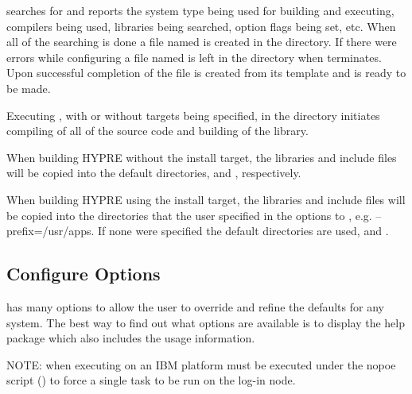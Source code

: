  searches for and reports the system type being used for building 
and executing, compilers being used, libraries being searched, option flags being set,
etc.  When all of the searching is done a file named  is created 
in the  directory.  If there were errors while configuring a file named 
 is left in the  directory when  terminates. 
Upon successful completion of  the file  
is created from its template  and \hypre{} is ready to be made.

Executing , with or without targets being specified, in the  directory 
initiates compiling of all of the source code and building of the \hypre{} library. 

When building HYPRE without the install target, the libraries and include files will be copied
into the default directories,  and , respectively.

When building HYPRE using the install target, the libraries and include files will be copied
into the directories that the user specified in the options to ,
e.g. --prefix=/usr/apps.  If none were specified the default directories are used,
 and .


\subsection{Configure Options}
\label{sec-Configure-Options}

 has many options to allow the user to override and refine the 
defaults for any system. The best way to find out what options are available is
to display the help package which also includes the usage information.

NOTE: when executing on an IBM platform  must be executed under 
the nopoe script () to force a single 
task to be run on the log-in node.

